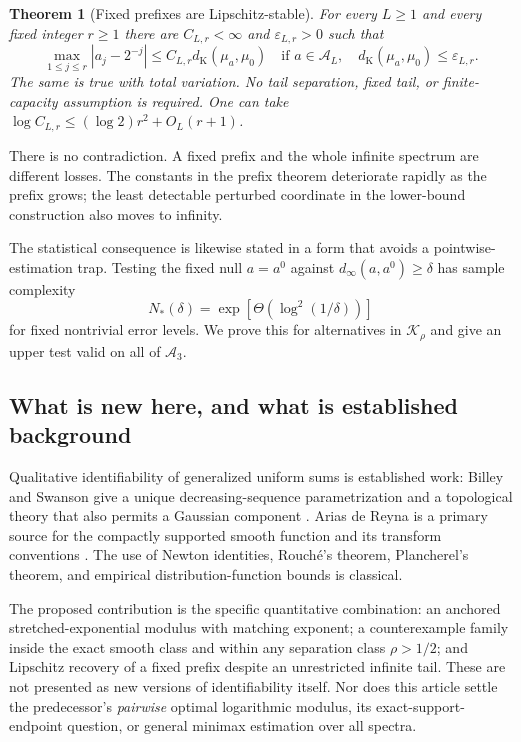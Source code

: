 \documentclass[11pt,a4paper]{article}
\numberwithin{equation}{section}
\newtheorem{theorem}{Theorem}[section]
\theoremstyle{definition}
\theoremstyle{remark}
\newcommand{\A}{\mathcal A}
\newcommand{\K}{\mathcal K}
\newcommand{\eps}{\varepsilon}
\newcommand{\distK}{d_{\mathrm K}}
\begin{document}
\begin{theorem}[Fixed prefixes are Lipschitz-stable]
\label{thm:prefix-intro}
For every $L\ge1$ and every fixed integer $r\ge1$ there are
$C_{L,r}<\infty$ and $\eps_{L,r}>0$ such that
\begin{equation}
 \max_{1\le j\le r}|a_j-2^{-j}|
 \le C_{L,r}\distK(\mu_a,\mu_0)
 \quad\text{if }a\in\A_L,\quad
 \distK(\mu_a,\mu_0)\le\eps_{L,r}.
 \label{eq:prefix-main}
\end{equation}
The same is true with total variation. No tail separation, fixed tail, or
finite-capacity assumption is required. One can take
$\log C_{L,r}\le(\log2)r^2+O_L(r+1)$.
\end{theorem}

There is no contradiction. A fixed prefix and the whole infinite spectrum are
different losses. The constants in the prefix theorem deteriorate rapidly as
the prefix grows; the least detectable perturbed coordinate in the lower-bound
construction also moves to infinity.

The statistical consequence is likewise stated in a form that avoids a
pointwise-estimation trap. Testing the fixed null $a=a^0$ against
$d_\infty(a,a^0)\ge\delta$ has sample complexity
\begin{equation}
 N_*(\delta)=\exp\!\left[\Theta\!\left(\log^2(1/\delta)\right)\right]
 \label{eq:testing-intro}
\end{equation}
for fixed nontrivial error levels. We prove this for alternatives in $\K_\rho$
and give an upper test valid on all of $\A_3$.

\subsection{What is new here, and what is established background}

Qualitative identifiability of generalized uniform sums is established work:
Billey and Swanson give a unique decreasing-sequence parametrization and a
topological theory that also permits a Gaussian component \cite{billey}.
Arias de Reyna is a primary source for the compactly supported smooth function
and its transform conventions \cite{arias}. The use of Newton identities,
Rouch\'e's theorem, Plancherel's theorem, and empirical distribution-function
bounds is classical.

The proposed contribution is the specific quantitative combination: an anchored
stretched-exponential modulus with matching exponent; a counterexample family
inside the exact smooth class and within any separation class $\rho>1/2$;
and Lipschitz recovery of a fixed prefix despite an unrestricted infinite tail.
These are not presented as new versions of identifiability itself. Nor does
this article settle the predecessor's \emph{pairwise} optimal logarithmic
modulus, its exact-support-endpoint question, or general minimax estimation over
all spectra.
\end{document}
